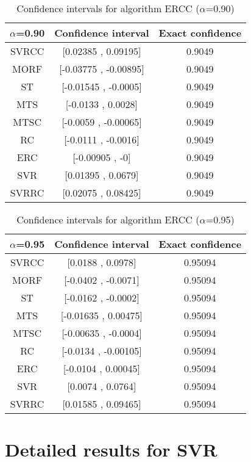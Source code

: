 \documentclass[a4paper,10pt]{article}
\begin{document}
\begin{table}[!htp]
\centering\small
\begin{tabular}{
|c|c|c|}
\hline
 $\alpha$=0.90 & Confidence interval & Exact confidence \\ \hline 
SVRCC & [0.02385 , 0.09195] & 0.9049\\ \hline 
MORF & [-0.03775 , -0.00895] & 0.9049\\ \hline 
ST & [-0.01545 , -0.0005] & 0.9049\\ \hline 
MTS & [-0.0133 , 0.0028] & 0.9049\\ \hline 
MTSC & [-0.0059 , -0.00065] & 0.9049\\ \hline 
RC & [-0.0111 , -0.0016] & 0.9049\\ \hline 
ERC & [-0.00905 , -0] & 0.9049\\ \hline 
SVR & [0.01395 , 0.0679] & 0.9049\\ \hline 
SVRRC & [0.02075 , 0.08425] & 0.9049\\ \hline 

\end{tabular}
\caption{Confidence intervals for algorithm ERCC ($\alpha$=0.90)}
\end{table}
\begin{table}[!htp]
\centering\small
\begin{tabular}{
|c|c|c|}
\hline
 $\alpha$=0.95 & Confidence interval & Exact confidence \\ \hline 
SVRCC & [0.0188 , 0.0978] & 0.95094\\ \hline 
MORF & [-0.0402 , -0.0071] & 0.95094\\ \hline 
ST & [-0.0162 , -0.0002] & 0.95094\\ \hline 
MTS & [-0.01635 , 0.00475] & 0.95094\\ \hline 
MTSC & [-0.00635 , -0.0004] & 0.95094\\ \hline 
RC & [-0.0134 , -0.00105] & 0.95094\\ \hline 
ERC & [-0.0104 , 0.00045] & 0.95094\\ \hline 
SVR & [0.0074 , 0.0764] & 0.95094\\ \hline 
SVRRC & [0.01585 , 0.09465] & 0.95094\\ \hline 

\end{tabular}
\caption{Confidence intervals for algorithm ERCC ($\alpha$=0.95)}
\end{table}

 \clearpage 


\section{Detailed results for SVR}
\end{document}
